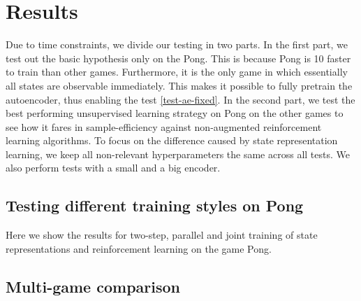 \chapter{Results}
Due to time constraints, we divide our testing in two parts.
In the first part, we test out the basic hypothesis only on the Pong.
This is because Pong is 10 faster to train than other games.
Furthermore, it is the only game in which essentially all states 
are observable immediately.
This makes it possible to fully pretrain the autoencoder,
thus enabling the test \ref{test-ae-fixed}.
In the second part, we test the best performing unsupervised learning
strategy on Pong on the other games to see how it fares in sample-efficiency
against non-augmented reinforcement learning algorithms.
To focus on the difference caused by state representation learning,
we keep all non-relevant hyperparameters the same across all tests.
We also perform tests with a small and a big encoder.

\section{Testing different training styles on Pong}
Here we show the results for two-step, parallel and joint training
of state representations and reinforcement learning on the game Pong.


\section{Multi-game comparison}

